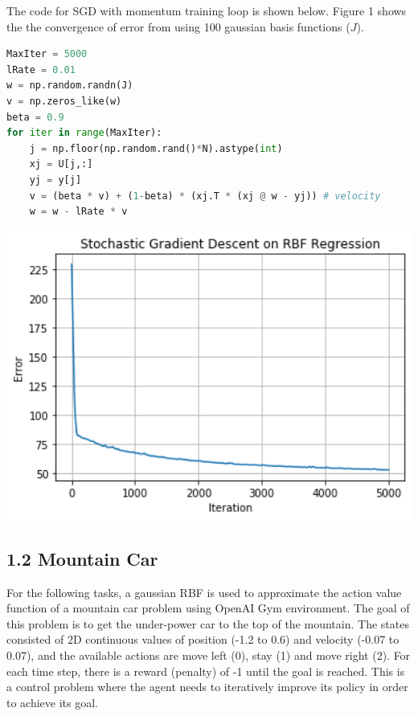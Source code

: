 \documentclass[12pt,letterpaper]{article}
\begin{document}
The code for SGD with momentum training loop is shown below.
Figure 1 shows the the convergence of error from using 100 gaussian basis functions ($J$).

\vspace{1.5em}

\begin{minipage}{0.5\textwidth}
 
\begin{lstlisting}[language=Python]
MaxIter = 5000
lRate = 0.01
w = np.random.randn(J)
v = np.zeros_like(w)
beta = 0.9
for iter in range(MaxIter):
    j = np.floor(np.random.rand()*N).astype(int)
    xj = U[j,:]
    yj = y[j]
    v = (beta * v) + (1-beta) * (xj.T * (xj @ w - yj)) # velocity
    w = w - lRate * v
\end{lstlisting}
\end{minipage}
\hfill
\begin{minipage}{0.45\textwidth}
\centering

\includegraphics[width=1.0\textwidth]{rbf_sgd.png}
\end{minipage}

\subsection*{1.2 Mountain Car}

For the following tasks, a gaussian RBF is used to approximate the action value function of a mountain car problem using OpenAI Gym environment.
The goal of this problem is to get the under-power car to the top of the mountain.
The states consisted of 2D continuous values of position (-1.2 to 0.6) and velocity (-0.07 to 0.07), 
and the available actions are move left (0), stay (1) and move right (2). 
For each time step, there is a reward (penalty) of -1 until the goal is reached.
This is a control problem where the agent needs to iteratively improve its policy in order to achieve its goal.
\vspace{-1em}
\end{document}
